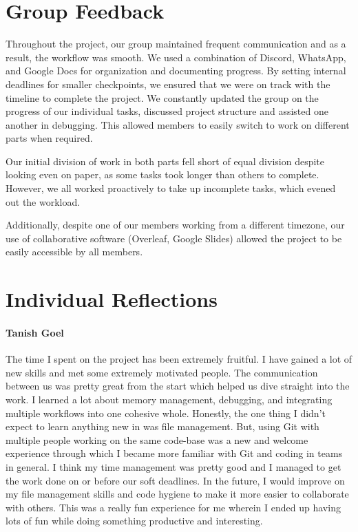 \documentclass[a4paper,11pt]{article}
\begin{document}
\section{Group Feedback}
Throughout the project, our group maintained frequent communication and as a result, the workflow was smooth. We used a combination of Discord, WhatsApp, and Google Docs for organization and documenting progress. By setting internal deadlines for smaller checkpoints, we ensured that we were on track with the timeline to complete the project. We constantly updated the group on the progress of our individual tasks, discussed project structure and assisted one another in debugging. This allowed members to easily switch to work on different parts when required. \newline

Our initial division of work in both parts fell short of equal division despite looking even on paper, as some tasks took longer than others to complete. However, we all worked proactively to take up incomplete tasks, which evened out the workload. \newline

Additionally, despite one of our members working from a different timezone, our use of collaborative software (Overleaf, Google Slides) allowed the project to be easily accessible by all members.

\section{Individual Reflections}

\paragraph{Tanish Goel} The time I spent on the project has been extremely fruitful. I have gained a lot of new skills and met some extremely motivated people. The communication between us was pretty great from the start which helped us dive straight into the work. I learned a lot about memory management, debugging, and integrating multiple workflows into one cohesive whole. Honestly, the one thing I didn't expect to learn anything new in was file management. But, using Git with multiple people working on the same code-base was a new and welcome experience through which I became more familiar with Git and coding in teams in general. I think my time management was pretty good and I managed to get the work done on or before our soft deadlines. In the future, I would improve on my file management skills and code hygiene to make it more easier to collaborate with others. This was a really fun experience for me wherein I ended up having lots of fun while doing something productive and interesting.
\end{document}
